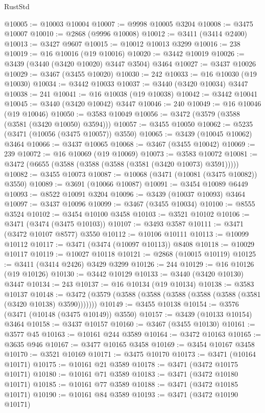 \begin{lexlean}{RustStd}
\begin{coremodule}
{{{{{{{{{{{{{{{{{{{@10005 := @10003 @10004
@10007 := @9998 @10005 @3204
@10008 := @3475 @10007
@10010 := @2868 (@9996 @10008)
@10012 := @3411 (@3414 @2400)
@10013 := @3427 @9607
@10015 := @10012 @10013 @3299
@10016 := 238
@10019 := @16 @10016 (@19 @10016)
@10020 := @3442 @10019
@10026 := @3439 (@3440 (@3420 @10020) @3447 @3504) @3464
@10027 := @3437 @10026
@10029 := @3467 (@3455 @10020)
@10030 := 242
@10033 := @16 @10030 (@19 @10030)
@10034 := @3442 @10033
@10037 := @3440 (@3420 @10034) @3447
@10038 := 241
@10041 := @16 @10038 (@19 @10038)
@10042 := @3442 @10041
@10045 := @3440 (@3420 @10042) @3447
@10046 := 240
@10049 := @16 @10046 (@19 @10046)
@10050 := @3583 @10049
@10056 := @3472 (@3579 (@3588 (@3581 (@3420 @10050) @3594)))
@10057 := @3455 @10050
@10062 := @5235 (@3471 (@10056 (@3475 @10057)) @3550)
@10065 := @3439 (@10045 @10062) @3464
@10066 := @3437 @10065
@10068 := @3467 (@3455 @10042)
@10069 := 239
@10072 := @16 @10069 (@19 @10069)
@10073 := @3583 @10072
@10081 := @3472 (@6655 (@3588 (@3588 (@3588 (@3581 (@3420 @10073) @3591)))))
@10082 := @3455 @10073
@10087 := @10068 (@3471 (@10081 (@3475 @10082)) @3550)
@10089 := @3691 (@10066 @10087)
@10091 := @3454 @10089 @6449
@10093 := @8522 @10091 @3204
@10096 := @3439 (@10037 @10093) @3464
@10097 := @3437 @10096
@10099 := @3467 (@3455 @10034)
@10100 := @8555 @3524
@10102 := @3454 @10100 @3458
@10103 := @3521 @10102
@10106 := @3471 (@3474 (@3475 @10103))
@10107 := @3493 @3587
@10111 := @3471 (@3472 @10107 @8577) @3550
@10112 := @10106 @10111
@10113 := @10099 @10112
@10117 := @3471 (@3474 (@10097 @10113)) @8408
@10118 := @10029 @10117
@10119 := @10027 @10118
@10121 := @2868 (@10015 @10119)
@10125 := @3411 (@3414 @2426) @3429 @3299
@10126 := 244
@10129 := @16 @10126 (@19 @10126)
@10130 := @3442 @10129
@10133 := @3440 (@3420 @10130) @3447
@10134 := 243
@10137 := @16 @10134 (@19 @10134)
@10138 := @3583 @10137
@10148 := @3472 (@3579 (@3588 (@3588 (@3588 (@3588 (@3588 (@3581 (@3420 @10138) @3590)))))))
@10149 := @3455 @10138
@10154 := @3576 (@3471 (@10148 (@3475 @10149)) @3550)
@10157 := @3439 (@10133 @10154) @3464
@10158 := @3437 @10157
@10160 := @3467 (@3455 @10130)
@10161 := @3577 @45
@10163 := @10161 @244 @3589
@10164 := @3472 @10163
@10165 := @3635 @946
@10167 := @3477 @10165 @3458
@10169 := @3454 @10167 @3458
@10170 := @3521 @10169
@10171 := @3475 @10170
@10173 := @3471 (@10164 @10171)
@10175 := @10161 @21 @3589
@10178 := @3471 (@3472 @10175 @10171)
@10180 := @10161 @71 @3589
@10183 := @3471 (@3472 @10180 @10171)
@10185 := @10161 @77 @3589
@10188 := @3471 (@3472 @10185 @10171)
@10190 := @10161 @84 @3589
@10193 := @3471 (@3472 @10190 @10171)
}}}}}}}}}}}}}}}}}}}
\end{coremodule}
\end{lexlean}
